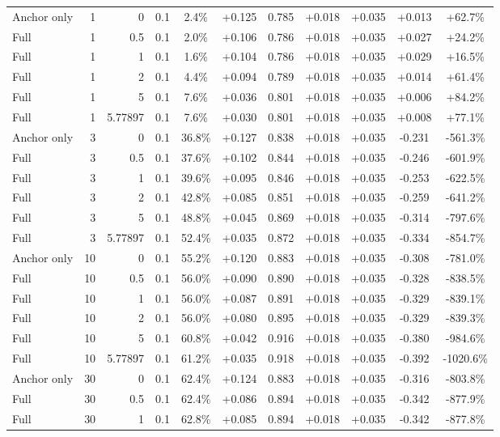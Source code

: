 \begin{table}[htbp]
\begin{tabular}{lrrrccccccc}
Anchor only & 1 & 0 & 0.1 & 2.4\% & +0.125 & 0.785 & +0.018 & +0.035 & +0.013 & +62.7\% \\
Full & 1 & 0.5 & 0.1 & 2.0\% & +0.106 & 0.786 & +0.018 & +0.035 & +0.027 & +24.2\% \\
Full & 1 & 1 & 0.1 & 1.6\% & +0.104 & 0.786 & +0.018 & +0.035 & +0.029 & +16.5\% \\
Full & 1 & 2 & 0.1 & 4.4\% & +0.094 & 0.789 & +0.018 & +0.035 & +0.014 & +61.4\% \\
Full & 1 & 5 & 0.1 & 7.6\% & +0.036 & 0.801 & +0.018 & +0.035 & +0.006 & +84.2\% \\
Full & 1 & 5.77897 & 0.1 & 7.6\% & +0.030 & 0.801 & +0.018 & +0.035 & +0.008 & +77.1\% \\
Anchor only & 3 & 0 & 0.1 & 36.8\% & +0.127 & 0.838 & +0.018 & +0.035 & -0.231 & -561.3\% \\
Full & 3 & 0.5 & 0.1 & 37.6\% & +0.102 & 0.844 & +0.018 & +0.035 & -0.246 & -601.9\% \\
Full & 3 & 1 & 0.1 & 39.6\% & +0.095 & 0.846 & +0.018 & +0.035 & -0.253 & -622.5\% \\
Full & 3 & 2 & 0.1 & 42.8\% & +0.085 & 0.851 & +0.018 & +0.035 & -0.259 & -641.2\% \\
Full & 3 & 5 & 0.1 & 48.8\% & +0.045 & 0.869 & +0.018 & +0.035 & -0.314 & -797.6\% \\
Full & 3 & 5.77897 & 0.1 & 52.4\% & +0.035 & 0.872 & +0.018 & +0.035 & -0.334 & -854.7\% \\
Anchor only & 10 & 0 & 0.1 & 55.2\% & +0.120 & 0.883 & +0.018 & +0.035 & -0.308 & -781.0\% \\
Full & 10 & 0.5 & 0.1 & 56.0\% & +0.090 & 0.890 & +0.018 & +0.035 & -0.328 & -838.5\% \\
Full & 10 & 1 & 0.1 & 56.0\% & +0.087 & 0.891 & +0.018 & +0.035 & -0.329 & -839.1\% \\
Full & 10 & 2 & 0.1 & 56.0\% & +0.080 & 0.895 & +0.018 & +0.035 & -0.329 & -839.3\% \\
Full & 10 & 5 & 0.1 & 60.8\% & +0.042 & 0.916 & +0.018 & +0.035 & -0.380 & -984.6\% \\
Full & 10 & 5.77897 & 0.1 & 61.2\% & +0.035 & 0.918 & +0.018 & +0.035 & -0.392 & -1020.6\% \\
Anchor only & 30 & 0 & 0.1 & 62.4\% & +0.124 & 0.883 & +0.018 & +0.035 & -0.316 & -803.8\% \\
Full & 30 & 0.5 & 0.1 & 62.4\% & +0.086 & 0.894 & +0.018 & +0.035 & -0.342 & -877.9\% \\
Full & 30 & 1 & 0.1 & 62.8\% & +0.085 & 0.894 & +0.018 & +0.035 & -0.342 & -877.8\% \\

\end{tabular}
\end{table}
